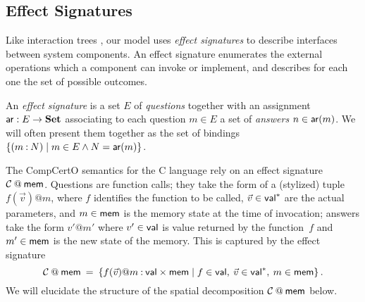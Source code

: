 \subsection{Effect Signatures} \label{sec:esig} %

Like interaction trees \cite{itrees},
our model uses \emph{effect signatures}
to describe interfaces between system components.
An effect signature enumerates
the external operations which
a component can invoke or implement,
and describes for each one
the set of possible outcomes.

\begin{definition} \label{def:esig}
An \emph{effect signature} is a set $E$ of \emph{questions}
together with an assignment $ \mathsf{ar}  : E \rightarrow \mathbf{Set}$
associating to each question $m \in E$
a set of \emph{answers} $n \in  \mathsf{ar} (m)$.
We will often present them together as the set of bindings
$\{ (m \mathbin: N) \mid m \in E \wedge N =  \mathsf{ar} (m) \}$.
\end{definition}


\begin{example} \label{ex:compcertosig} %

The CompCertO semantics for the C language
rely on an effect signature $\mathcal{C} \mathbin@ \kw{mem}$.
Questions are function calls;
they take the form of a (stylized) tuple $f(\vec{v})@m$, where
$f$ identifies the function to be called,
$\vec{v} \in  \mathsf{val} ^*$ are the actual parameters, and
$m \in  \mathsf{mem} $ is the memory state at the time of invocation;
answers take the form $v'@m'$ where
$v' \in  \mathsf{val} $ is value returned by the function~$f$ and
$m' \in  \mathsf{mem} $ is the new state of the memory.
This is captured by the effect signature
\[
  \mathcal{C} \mathbin@ \kw{mem} \:=\:
  \{ f(\vec{v})@m \mathbin: \kw{val} \times \kw{mem} \mid
     f \in \kw{val}, \:
     \vec{v} \in \kw{val}^*, \:
     m \in \kw{mem} \}
  \,.
\]
We will elucidate the structure of
the spatial decomposition $\mathcal{C} \mathbin@ \kw{mem}$ below.
\end{example}

